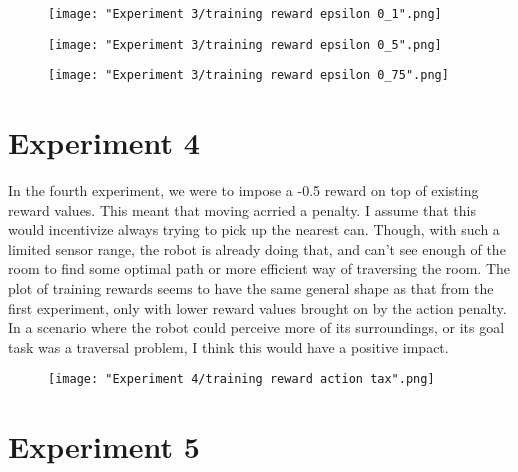 \documentclass{article}
\begin{document}
\begin{figure}[h!]
    \noindent\texttt{[image: "Experiment 3/training reward epsilon 0\_1".png]}
\end{figure}

\begin{figure}[h!]
    \noindent\texttt{[image: "Experiment 3/training reward epsilon 0\_5".png]}
\end{figure}

\begin{figure}[h!]
    \noindent\texttt{[image: "Experiment 3/training reward epsilon 0\_75".png]}
\end{figure}


\clearpage
\section{Experiment 4}

\begin{flushleft}
In the fourth experiment, we were to impose a -0.5 reward on top of existing reward values.  This meant that moving acrried a penalty.  I assume that this would incentivize always trying to pick up the nearest can.  Though, with such a limited sensor range, the robot is already doing that, and can't see enough of the room to find some optimal path or more efficient way of traversing the room.  The plot of training rewards seems to have the same general shape as that from the first experiment, only with lower reward values brought on by the action penalty.  In a scenario where the robot could perceive more of its surroundings, or its goal task was a traversal problem, I think this would have a positive impact.  
\end{flushleft}

\begin{figure}[h!]
    \noindent\texttt{[image: "Experiment 4/training reward action tax".png]}
\end{figure}


\clearpage
\section{Experiment 5}
\end{document}
